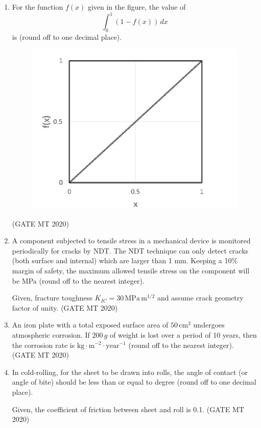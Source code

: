 \documentclass[journal, 11pt, onecolumn]{IEEEtran}
\theoremstyle{remark}
\begin{document}
\begin{enumerate}
\item For the function $f(x)$ given in the figure, the value of 
$$
\int_{0}^{1} (1 - f(x)) \, dx
$$
is \underline{\hspace{2cm}} (round off to one decimal place).  

\begin{figure}[H]
    \centering
    \includegraphics[width=0.5\linewidth]{figs/image6''.png}
    \caption{}
    \label{fig:placeholder}
\end{figure}
\hfill(GATE MT 2020)


\item A component subjected to tensile stress in a mechanical device is monitored periodically for cracks by NDT. The NDT technique can only detect cracks (both surface and internal) which are larger than 1 mm. Keeping a 10\% margin of safety, the maximum allowed tensile stress on the component will be \underline{\hspace{2cm}} MPa (round off to the nearest integer).  

Given, fracture toughness $K_{IC} = 30 \, \text{MPa} \, \text{m}^{1/2}$ and assume crack geometry factor of unity.
\hfill(GATE MT 2020)


\item An iron plate with a total exposed surface area of $50 \, \text{cm}^2$ undergoes atmospheric corrosion. If $200 \, g$ of weight is lost over a period of 10 years, then the corrosion rate is \underline{\hspace{2cm}} $\text{kg} \cdot \text{m}^{-2} \cdot \text{year}^{-1}$ (round off to the nearest integer).
\hfill(GATE MT 2020)


\item In cold-rolling, for the sheet to be drawn into rolls, the angle of contact (or angle of bite) should be less than or equal to \underline{\hspace{2cm}} degree (round off to one decimal place).  

Given, the coefficient of friction between sheet and roll is 0.1.
\hfill(GATE MT 2020)



\end{enumerate}
\end{document}
